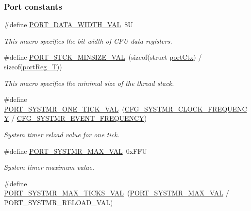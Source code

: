 \subsubsection*{Port constants}
\begin{DoxyCompactItemize}
\item 
\#define \hyperlink{group__template__cpu__intf_gac4d9e19c50315dec7721d4bc4d6b0605}{P\-O\-R\-T\-\_\-\-D\-A\-T\-A\-\_\-\-W\-I\-D\-T\-H\-\_\-\-V\-A\-L}~8\-U
\begin{DoxyCompactList}\small\item\em This macro specifies the bit width of C\-P\-U data registers. \end{DoxyCompactList}\item 
\#define \hyperlink{group__template__cpu__intf_ga99f0219f12d2003e4e447fcaa06aa133}{P\-O\-R\-T\-\_\-\-S\-T\-C\-K\-\_\-\-M\-I\-N\-S\-I\-Z\-E\-\_\-\-V\-A\-L}~(sizeof(struct \hyperlink{structportCtx}{port\-Ctx}) / sizeof(\hyperlink{group__template__cpu__intf_ga99980ab56ce9857e7380210d12e3d41f}{port\-Reg\-\_\-\-T}))
\begin{DoxyCompactList}\small\item\em This macro specifies the minimal size of the thread stack. \end{DoxyCompactList}\item 
\#define \hyperlink{group__template__cpu__intf_gaa909258f3d25701e167c8dcb2a004eaf}{P\-O\-R\-T\-\_\-\-S\-Y\-S\-T\-M\-R\-\_\-\-O\-N\-E\-\_\-\-T\-I\-C\-K\-\_\-\-V\-A\-L}~(\hyperlink{group__template__cpu__cfg_gac85c592962ba2c968d13f867533196a1}{C\-F\-G\-\_\-\-S\-Y\-S\-T\-M\-R\-\_\-\-C\-L\-O\-C\-K\-\_\-\-F\-R\-E\-Q\-U\-E\-N\-C\-Y} / \hyperlink{group__template__kern__cfg_ga4e46164ae5a37bfc54c67b6f01d93eb1}{C\-F\-G\-\_\-\-S\-Y\-S\-T\-M\-R\-\_\-\-E\-V\-E\-N\-T\-\_\-\-F\-R\-E\-Q\-U\-E\-N\-C\-Y})
\begin{DoxyCompactList}\small\item\em System timer reload value for one tick. \end{DoxyCompactList}\item 
\#define \hyperlink{group__template__cpu__intf_ga5b8bb3d2476505b4379ca2b87ec22547}{P\-O\-R\-T\-\_\-\-S\-Y\-S\-T\-M\-R\-\_\-\-M\-A\-X\-\_\-\-V\-A\-L}~0x\-F\-F\-U
\begin{DoxyCompactList}\small\item\em System timer maximum value. \end{DoxyCompactList}\item 
\#define \hyperlink{group__template__cpu__intf_gad32a57bda2ce96037186e490b5a024e9}{P\-O\-R\-T\-\_\-\-S\-Y\-S\-T\-M\-R\-\_\-\-M\-A\-X\-\_\-\-T\-I\-C\-K\-S\-\_\-\-V\-A\-L}~(\hyperlink{group__template__cpu__intf_ga5b8bb3d2476505b4379ca2b87ec22547}{P\-O\-R\-T\-\_\-\-S\-Y\-S\-T\-M\-R\-\_\-\-M\-A\-X\-\_\-\-V\-A\-L} / P\-O\-R\-T\-\_\-\-S\-Y\-S\-T\-M\-R\-\_\-\-R\-E\-L\-O\-A\-D\-\_\-\-V\-A\-L)

\end{DoxyCompactItemize}
